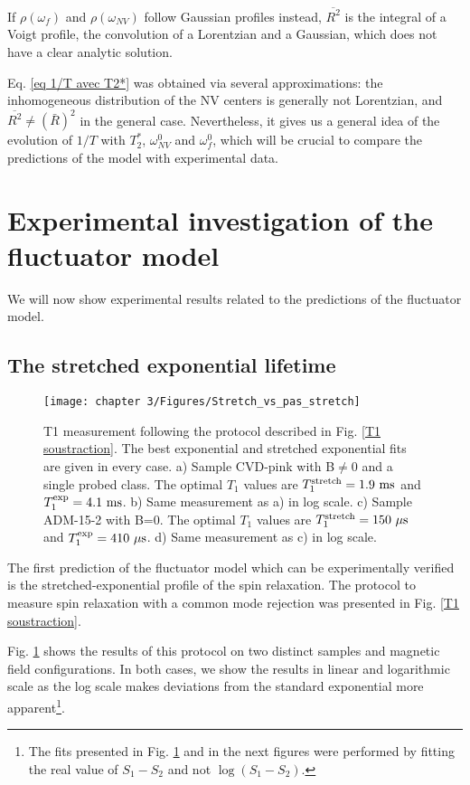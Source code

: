 \documentclass[a4paper, 11pt]{report}
\begin{document}
If $\rho(\omega_{f})$ and $\rho(\omega_{NV})$ follow Gaussian profiles instead, $\overline{R^2}$ is the integral of a Voigt profile, the convolution of a Lorentzian and a Gaussian, which does not have a clear analytic solution.

Eq. \ref{eq 1/T avec T2*} was obtained via several approximations: the inhomogeneous distribution of the NV centers is generally not Lorentzian, and $\overline{R^2} \neq (\bar{R})^2$ in the general case. Nevertheless, it gives us a general idea of the evolution of $1/T$ with $T_2^*$, $\omega_{NV}^0$ and $\omega_{f}^0$, which will be crucial to compare the predictions of the model with experimental data.






\section{Experimental investigation of the fluctuator model}
We will now show experimental results related to the predictions of the fluctuator model.
\subsection{The stretched exponential lifetime}
\begin{figure}[h]
\centering
\texttt{[image: chapter 3/Figures/Stretch\_vs\_pas\_stretch]}
\caption{T1 measurement following the protocol described in Fig. \ref{T1 soustraction}. The best exponential and stretched exponential fits are given in every case. a) Sample CVD-pink with B$\neq$0 and a single  probed class. The optimal $T_1$ values are $T_1^{\rm stretch}=1.9\ \rm ms$ and $T_1^{\rm exp}=4.1\ \rm ms$. b) Same measurement as a) in log scale. c) Sample ADM-15-2 with B=0. The optimal $T_1$ values are $T_1^{\rm stretch}=150\ \mu \rm s$ and $T_1^{\rm exp}=410\ \mu \rm s$. d) Same measurement as c) in log scale.}
\label{stretch_or_not_stretch}
\end{figure}

The first prediction of the fluctuator model which can be experimentally verified is the stretched-exponential profile of the spin relaxation. The protocol to measure spin relaxation with a common mode rejection was presented in Fig. \ref{T1 soustraction}. 

Fig. \ref{stretch_or_not_stretch} shows the results of this protocol on two distinct samples and magnetic field configurations. In both cases, we show the results in linear and logarithmic scale as the log scale makes deviations from the standard exponential more apparent\footnote{The fits presented in Fig. \ref{stretch_or_not_stretch} and in the next figures were performed by fitting the real value of $S_1-S_2$ and not $\log(S_1-S_2)$.}.
\end{document}
